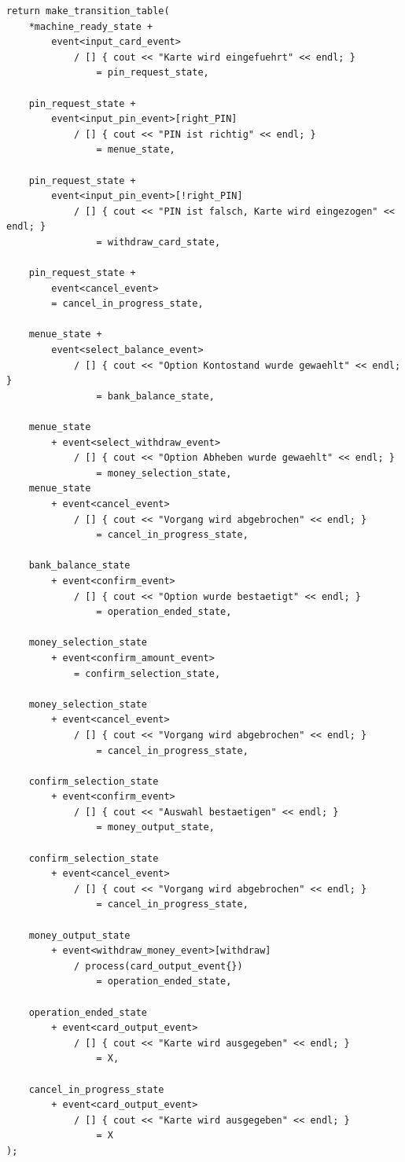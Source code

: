 \documentclass{report}
\begin{document}
\begin{lstlisting}
return make_transition_table(
    *machine_ready_state + 
        event<input_card_event> 
            / [] { cout << "Karte wird eingefuehrt" << endl; } 
                = pin_request_state,

    pin_request_state + 
        event<input_pin_event>[right_PIN] 
            / [] { cout << "PIN ist richtig" << endl; } 
                = menue_state,

    pin_request_state + 
        event<input_pin_event>[!right_PIN] 
            / [] { cout << "PIN ist falsch, Karte wird eingezogen" << endl; } 
                = withdraw_card_state,

    pin_request_state +
        event<cancel_event> 
        = cancel_in_progress_state,

    menue_state + 
        event<select_balance_event> 
            / [] { cout << "Option Kontostand wurde gewaehlt" << endl; } 
                = bank_balance_state,

    menue_state 
        + event<select_withdraw_event> 
            / [] { cout << "Option Abheben wurde gewaehlt" << endl; } 
                = money_selection_state,
    menue_state 
        + event<cancel_event> 
            / [] { cout << "Vorgang wird abgebrochen" << endl; } 
                = cancel_in_progress_state,

    bank_balance_state 
        + event<confirm_event> 
            / [] { cout << "Option wurde bestaetigt" << endl; } 
                = operation_ended_state,

    money_selection_state 
        + event<confirm_amount_event> 
            = confirm_selection_state,

    money_selection_state 
        + event<cancel_event> 
            / [] { cout << "Vorgang wird abgebrochen" << endl; } 
                = cancel_in_progress_state,

    confirm_selection_state 
        + event<confirm_event> 
            / [] { cout << "Auswahl bestaetigen" << endl; } 
                = money_output_state,

    confirm_selection_state 
        + event<cancel_event> 
            / [] { cout << "Vorgang wird abgebrochen" << endl; } 
                = cancel_in_progress_state,

    money_output_state 
        + event<withdraw_money_event>[withdraw] 
            / process(card_output_event{}) 
                = operation_ended_state,

    operation_ended_state 
        + event<card_output_event> 
            / [] { cout << "Karte wird ausgegeben" << endl; } 
                = X,

    cancel_in_progress_state 
        + event<card_output_event> 
            / [] { cout << "Karte wird ausgegeben" << endl; } 
                = X
);
\end{lstlisting}
\end{document}
